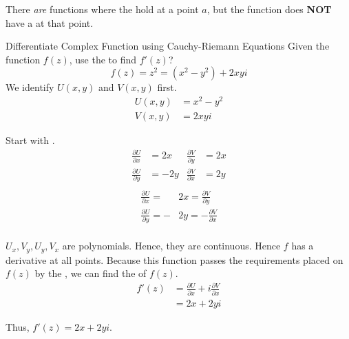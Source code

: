\begin{remark*}
  There \textit{are} functions where the  hold at a point $a$, but the function does \textbf{NOT} have a  at that point.
\end{remark*}

\begin{example}[Lecture 5]{Differentiate Complex Function using Cauchy-Riemann Equations}
  Given the function $f(z)$, use the  to find $f'(z)$?
  \begin{equation*}
    f(z) = z^{2} = \left( x^{2} - y^{2} \right) + 2xyi
  \end{equation*}
  \tcblower{}
  We identify $U(x, y)$ and $V(x, y)$ first.
  \begin{align*}
    U(x, y) &= x^{2} - y^{2} \\
    V(x, y) &= 2xyi
  \end{align*}

  Start with .
  \begin{align*}
    \frac{\partial U}{\partial x} &= 2x & \frac{\partial V}{\partial y} &= 2x \\
    \frac{\partial U}{\partial y} &= -2y & \frac{\partial V}{\partial x} &= 2y \\
  \end{align*}
  \begin{align*}
    \frac{\partial U}{\partial x} = &2x = \frac{\partial V}{\partial y} \\
    \frac{\partial U}{\partial y} = -&2y = -\frac{\partial V}{\partial x} \\
  \end{align*}

  $U_{x}, V_{y}, U_{y}, V_{x}$ are polynomials.
  Hence, they are continuous.
  Hence $f$ has a derivative at all points.
  Because this function passes the requirements placed on $f(z)$ by the , we can find the  of $f(z)$.
  \begin{align*}
    f'(z) &= \frac{\partial U}{\partial x} + i \frac{\partial V}{\partial x} \\
          &= 2x + 2yi
  \end{align*}

  Thus, $f'(z) = 2x + 2yi$.
\end{example}

